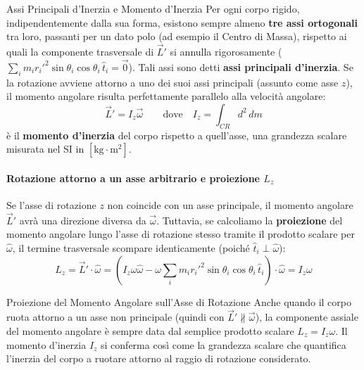 \begin{definizione}{Assi Principali d'Inerzia e Momento d'Inerzia}
Per ogni corpo rigido, indipendentemente dalla sua forma, esistono sempre almeno \textbf{tre assi ortogonali} tra loro, passanti per un dato polo (ad esempio il Centro di Massa), rispetto ai quali la componente trasversale di $\vec{L}'$ si annulla rigorosamente ($\sum_i m_i {r_i'}^2 \sin\theta_i \cos\theta_i \, \hat{t}_i = \vec{0}$). Tali assi sono detti \textbf{assi principali d'inerzia}.
Se la rotazione avviene attorno a uno dei suoi assi principali (assunto come asse $z$), il momento angolare risulta perfettamente parallelo alla velocità angolare:
\begin{equation}
    \vec{L}' = I_z \vec{\omega} \qquad \text{dove} \quad I_z = \int_{CR} d^2 \, dm
\end{equation}
è il \textbf{momento d'inerzia} del corpo rispetto a quell'asse, una grandezza scalare misurata nel SI in $[\text{kg} \cdot \text{m}^2]$.
\end{definizione}

\paragraph{Rotazione attorno a un asse arbitrario e proiezione $L_z$}
Se l'asse di rotazione $z$ non coincide con un asse principale, il momento angolare $\vec{L}'$ avrà una direzione diversa da $\vec{\omega}$. Tuttavia, se calcoliamo la \textbf{proiezione} del momento angolare lungo l'asse di rotazione stesso tramite il prodotto scalare per $\hat{\omega}$, il termine trasversale scompare identicamente (poiché $\hat{t}_i \perp \hat{\omega}$):
\begin{equation}
    L_z = \vec{L}' \cdot \hat{\omega} = \left( I_z \omega \hat{\omega} - \omega \sum_i m_i {r_i'}^2 \sin\theta_i \cos\theta_i \, \hat{t}_i \right) \cdot \hat{\omega} = I_z \omega
\end{equation}

\begin{osservazione}{Proiezione del Momento Angolare sull'Asse di Rotazione}
Anche quando il corpo ruota attorno a un asse non principale (quindi con $\vec{L}' \not\parallel \vec{\omega}$), la componente assiale del momento angolare è sempre data dal semplice prodotto scalare $L_z = I_z \omega$. Il momento d'inerzia $I_z$ si conferma così come la grandezza scalare che quantifica l'inerzia del corpo a ruotare attorno al raggio di rotazione considerato.
\end{osservazione}

